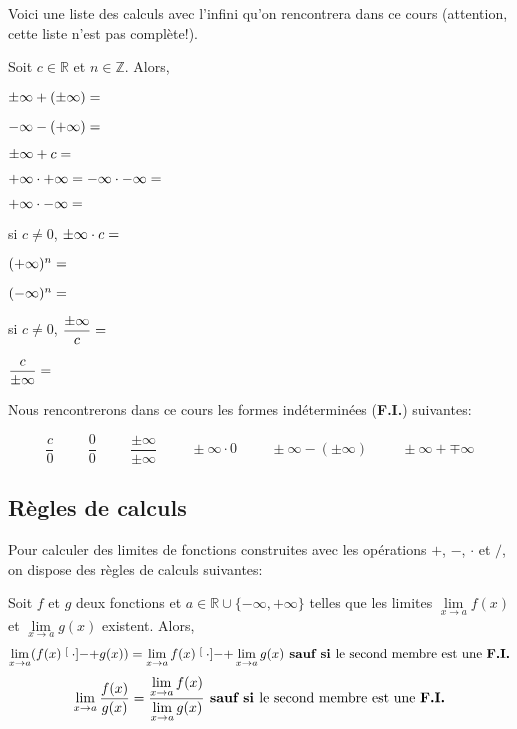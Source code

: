 \documentclass[a4paper,12pt]{report}
\newcommand{\IR}{\mathbb{R}}
\newcommand{\IZ}{\mathbb{Z}}
\newcommand{\pinf}{+\infty}
\newcommand{\minf}{-\infty}
\newcommand{\pminf}{\pm\infty}
\newcommand{\FI}{\textbf{F.I.}}
\begin{document}
Voici une liste des calculs avec l'infini qu'on rencontrera  dans ce cours
(attention, cette liste n'est pas complète!).
\begin{boite}
Soit \(c\in\IR\) et \(n\in\IZ\). Alors,
\par \setlength{\columnseprule}{0 pt}
          \begin{minipage}[t]{\linewidth}
          \begin{multicols}{2}
\(\pminf + (\pminf) = \dotfill\)


\(\minf - (\pinf) = \dotfill\)

\(\pminf + c=\dotfill\)


\(\pinf\cdot\pinf=\minf\cdot\minf =\dotfill\)

\(\pinf\cdot\minf=\dotfill\)

si \(c\neq 0\), \(\pm\infty\cdot c=\dotfill\)

\((\pinf)^n=\dotfill\)

\((\minf)^n=\dotfill\)


si \(c\neq 0\), \(\dfrac{\pminf}{c}=\dotfill\)


\(\dfrac{c}{\pminf}=\dotfill\)




\end{multicols}\end{minipage}
\end{boite}


Nous rencontrerons dans ce cours les formes indéterminées (\FI{})
suivantes:
\begin{boite}
\[
\frac{c}{0}\hspace{1cm}\frac{0}{0}\hspace{1cm}\frac{\pminf}{\pminf}\hspace{1cm}\pminf\cdot
0\hspace{1cm} \pminf - (\pminf) \hspace{1cm} \pminf + \mp\infty
\]
\end{boite}

\subsection{Règles de calculs}
\label{sec:org9553d11}
Pour calculer des limites de fonctions construites avec les opérations
\(+\), \(-\), \(\cdot\) et \(/\), on dispose des règles de calculs suivantes:
\begin{propriete}
Soit \(f\) et \(g\) deux fonctions et \(a\in\IR\cup\{\minf,\pinf\}\) telles
que les limites \(\lim\limits_{x\to a}f(x)\) et \(\lim\limits_{x\to
a}g(x)\) existent. Alors,
\[
\lim\limits_{x\to a}(f(x)
\stackrel[\displaystyle\cdot]{\displaystyle-}{+} g(x))
=\lim\limits_{x\to a}f(x)
\stackrel[\displaystyle\cdot]{\displaystyle-}{+}
\lim\limits_{x\to a}g(x)\textbf{ sauf si }
\text{le second membre est une \FI{}}
\]
\[
\lim\limits_{x\to a}\dfrac{f(x)}{g(x)}=\dfrac{\lim\limits_{x\to
  a}f(x)}{\lim\limits_{x\to a}g(x)}\textbf{ sauf si }\text{le second
membre est une \FI{}}
\]
\end{propriete}
\end{document}
